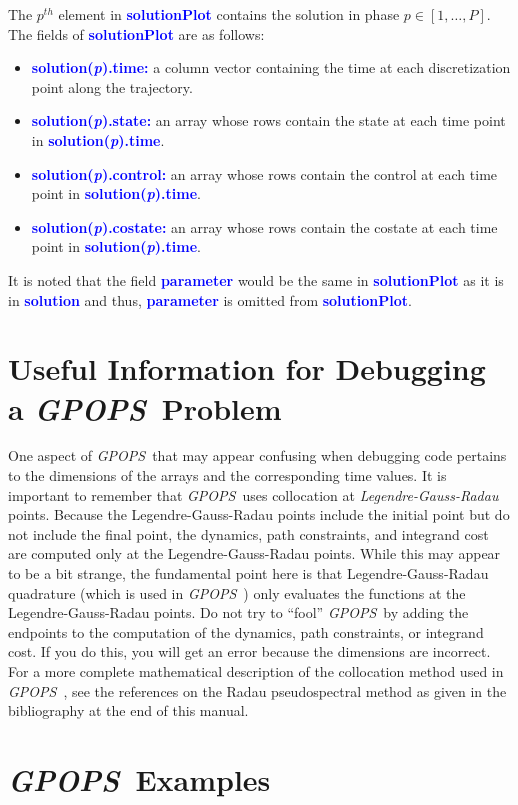 \documentclass[10pt]{article}
\newcommand{\gpops}{{\em GPOPS}~}
\newcommand{\bfblue}[1]{\textcolor{blue}{\bf #1}}
\begin{document}
The $p^{th}$ element in \bfblue{solutionPlot} contains the solution in
phase $p\in[1,\ldots,P]$.  The fields of \bfblue{solutionPlot} are as follows:
\begin{itemize}
 \item \bfblue{solution(\textit{p}).time:} a column vector containing
  the time at each discretization point along the trajectory.  
 \item \bfblue{solution(\textit{p}).state:} an array whose rows
  contain the state at each time point in
  \bfblue{solution(\textit{p}).time}.   
 \item \bfblue{solution(\textit{p}).control:} an array whose rows
 contain the control at each time point in \bfblue{solution(\textit{p}).time}.   
\item \bfblue{solution(\textit{p}).costate:} an array whose rows
contain the costate at each time point in \bfblue{solution(\textit{p}).time}.   
\end{itemize}
It is noted that the field \bfblue{parameter} would be the same in
\bfblue{solutionPlot} as it is in \bfblue{solution} and thus,
\bfblue{parameter} is omitted from \bfblue{solutionPlot}.  

\section{Useful Information for Debugging a \gpops Problem}

One aspect of \gpops that may appear confusing when debugging
code pertains to the dimensions of the arrays and the corresponding
time values.  It is important to remember that \gpops uses
collocation at {\em Legendre-Gauss-Radau} points.  Because the
Legendre-Gauss-Radau points include the initial point but do not
include the final point, the dynamics, path constraints, and integrand
cost are computed only at the Legendre-Gauss-Radau points.  While this
may appear to be a bit strange, the fundamental point here is that
Legendre-Gauss-Radau quadrature (which is used in \gpops) only
evaluates the functions at the Legendre-Gauss-Radau points.  Do not
try to ``fool'' \gpops by adding the endpoints to the computation of
the dynamics, path constraints, or integrand cost.  If you do this,
you will get an error because the dimensions are incorrect.  For a
more complete mathematical description of the collocation method used
in \gpops, see the references on the Radau pseudospectral method as
given in the bibliography at the end of this manual. 

\section{\gpops Examples}
\end{document}
